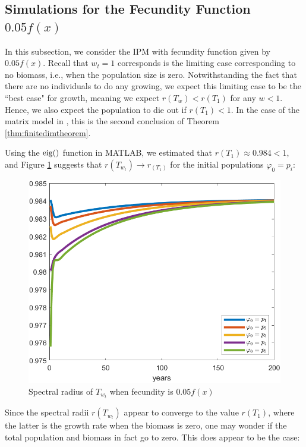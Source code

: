 \subsection{Simulations for the Fecundity Function $0.05f(x)$} \label{subsec:0.05f(x)}

In this subsection, we consider the IPM with fecundity function given by $0.05f(x)$. Recall that $w_t = 1$ corresponds is the limiting case corresponding to no biomass, i.e., when the population size is zero. Notwithstanding the fact that there are no individuals to do any growing, we expect this limiting case to be the ``best case" for growth, meaning we expect $r(T_w) < r(T_1)$ for any $w<1$. Hence, we also expect the population to die out if $r(T_1)<1$. In the case of the matrix model in \cite{Callahan2019}, this is the second conclusion of Theorem \ref{thm:finitedimtheorem}.

Using the $\operatorname{eig}()$ function in MATLAB, we estimated that $r(T_1) \approx 0.984 < 1$, and Figure \ref{fig:spectralradiuswhenf=0.05} suggests that $r(T_{w_t}) \to r_(T_1)$ for the initial populations $\varphi_0 = p_i$:

\begin{figure}[H]
	\centering
	\includegraphics[width=0.6\linewidth]{Images/F=0.05/spectral_radius_when_f=0.05}
	\caption{Spectral radius of $T_{w_t}$ when fecundity is $0.05f(x)$}
	\label{fig:spectralradiuswhenf=0.05}
\end{figure}

Since the spectral radii $r(T_{w_t})$ appear to converge to the value $r(T_1)$, where the latter is the growth rate when the biomass is zero, one may wonder if the total population and biomass in fact go to zero. This does appear to be the case:

